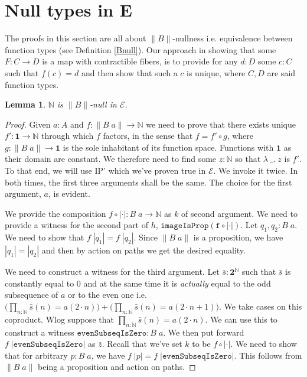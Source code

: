 \documentclass[12pt]{report}
\newtheorem{lem}[thm]{Lemma}
\begin{document}
\section{Null types in E}
The proofs in this section are all about $\lVert B \rVert$-nullness i.e. equivalence between function types (see Definition \ref{Bnull}). 
Our approach in showing that some $F: C\rightarrow D$ is a map with contractible fibers, is to provide for any $d :D$ some $c :C$ such that $f(c) = d$ and then show that such a $c$ is unique, where $C,D$ are said function types. 
\begin{lem}\label{NisBnull}
$\mathbb{N}$ is $\lVert B \rVert$-null in $\mathcal{E}$.
\end{lem}
\begin{proof}
Given $a : A$ and $f : \lVert B\; a \rVert \rightarrow \mathbb{N}$ we need to prove that there exists unique $f' : \mathbf{1} \rightarrow \mathbb{N}$ through which $f$ factors, in the sense that $f = f' \circ g$, where $g : \lVert B\; a \rVert \rightarrow \mathbf{1}$ is the sole inhabitant of its function space. 
Functions with $\mathbf{1}$ as their domain are constant. 
We therefore need to find some $z : \mathbb{N}$ so that $\lambda\; \_.\; z$ is $f'$. 
To that end, we will use IP' which we've proven true in $\mathcal{E}$. 
We invoke it twice. 
In both times, the first three arguments shall be the same. 
The choice for the first argument, $a$, is evident. 

We provide the composition $f \circ |\cdot| : B\; a \rightarrow \mathbb{N}$ as $k$ of second argument. 
We need to provide a witness for the second part of $h$, $\mathtt{imageIsProp(f \circ |\cdot|)}$. 
Let $q_1,q_2 : B\;a$. 
We need to show that $f\;|q_1| = f\; |q_2|$. 
Since $\lVert B\; a\rVert$ is a proposition, we have $|q_1| = |q_2|$ and then by action on paths we get the desired equality.

We need to construct a witness for the third argument. 
Let $\bar{s} : \mathbf{2}^\mathbb{N}$ such that $\bar{s}$ is constantly equal to $0$ and at the same time it is \textit{actually} equal to the odd subsequence of $a$ or to the even one i.e. $\big(\prod_{n : \mathbb{N}} \bar{s}(n) = a(2 \cdot n)\big) + \big(\prod_{n : \mathbb{N}} \bar{s}(n) = a(2\cdot n +1)\big)$. 
We take cases on this coproduct. 
Wlog suppose that $\prod_{n : \mathbb{N}} \bar{s}(n) = a(2 \cdot n)$. 
We can use this to construct a witness $\mathtt{evenSubseqIsZero} : B\;a$. 
We then put forward $f\;|\mathtt{evenSubseqIsZero}|$ as $\bar{z}$. 
Recall that we've set $k$ to be $f\circ |\cdot|$.
We need to show that for arbitrary $p : B\;a $, we have $f\; |p| = f\;|\mathtt{evenSubseqIsZero}|$. 
This follows from $\lVert B\;a\rVert$ being a proposition and action on paths. 


\end{proof}
\end{document}

